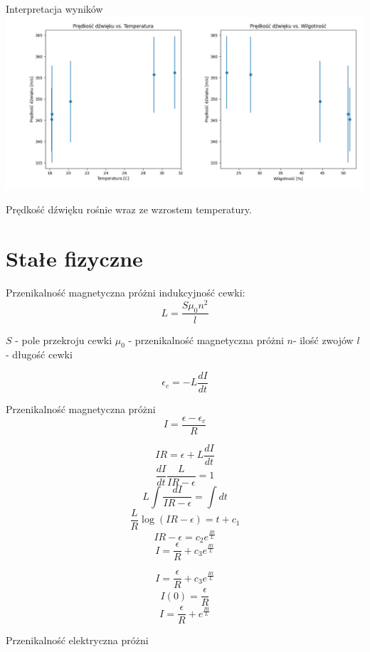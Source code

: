 \documentclass{beamer}
\begin{document}
\begin{frame}{Interpretacja wyników}
\includegraphics[width=\linewidth]{temp_humid_mach.png}

Prędkość dźwięku rośnie wraz ze wzrostem temperatury.
\end{frame}


\section{Stałe fizyczne}

\begin{frame}{Przenikalność magnetyczna próżni}
indukcyjność cewki:
$$L = \frac{S\mu_0 n^2}{l}$$

$S$ - pole przekroju cewki
$\mu_0$ - przenikalność magnetyczna próżni
$n$- ilość zwojów
$l$ - długość cewki

$$\epsilon_c = -L\frac{dI}{dt}$$

\end{frame}

\begin{frame}{Przenikalność magnetyczna próżni}
$$I = \frac{\epsilon-\epsilon_c}{R}$$

$$I R = \epsilon + L\frac{dI}{dt}$$
$$\frac{dI}{dt}\frac{L}{IR-\epsilon}=1$$
$$L\int\frac{dI}{IR-\epsilon} = \int dt$$
$$\frac{L}{R}\log(IR-\epsilon) = t+c_1$$
$$IR - \epsilon = c_2 e^{\frac{Rt}{L}}$$
$$I = \frac{\epsilon}{R} + c_3 e^{\frac{Rt}{L}}$$

\end{frame}

\begin{frame}
$$I = \frac{\epsilon}{R} + c_3 e^{\frac{Rt}{L}}$$
$$I(0)= \frac{\epsilon}{R}$$
$$I = \frac{\epsilon}{R} + e^{\frac{Rt}{L}}$$
\end{frame}

\begin{frame}{Przenikalność elektryczna próżni}

\end{frame}
\end{document}
